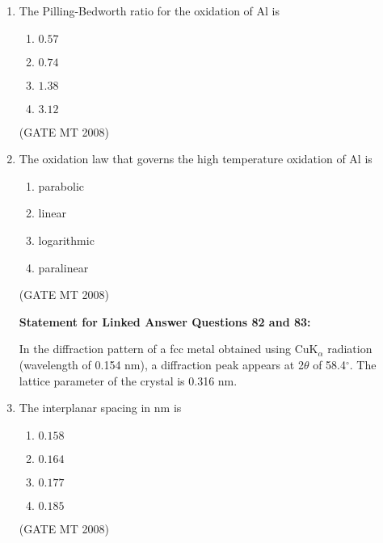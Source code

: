 \documentclass[11pt, letterpaper]{article}
\theoremstyle{remark}
\begin{document}
\begin{enumerate}[label=Q.\arabic*]
    \item The Pilling-Bedworth ratio for the oxidation of Al is
    \begin{multicols}{4}
        \begin{enumerate}[label=(\MakeUppercase{\alph*})]
            \item $0.57$
            \item $0.74$
            \item $1.38$
            \item $3.12$
        \end{enumerate}
    \end{multicols}
\hfill(GATE MT 2008)
    \item The oxidation law that governs the high temperature oxidation of Al is
    \vspace{-0.9em}
    \begin{multicols}{4}
        \begin{enumerate}[label=(\MakeUppercase{\alph*})]
            \item parabolic
            \item linear
            \item logarithmic
            \item paralinear
        \end{enumerate}
    \end{multicols}
\hfill(GATE MT 2008)\\
    \vspace{0.5em}
    
    \textbf{Statement for Linked Answer Questions 82 and 83:}

    In the diffraction pattern of a fcc metal obtained using CuK$_\alpha$ radiation (wavelength of 0.154 nm), 
    a diffraction peak appears at 2$\theta$ of 58.4$^\circ$. The lattice parameter of the crystal is 0.316 nm.

    \item The interplanar spacing in nm is
    \vspace{-0.9em}
    \begin{multicols}{4}
        \begin{enumerate}[label=(\MakeUppercase{\alph*})]
            \item $0.158$
            \item $0.164$
            \item $0.177$
            \item $0.185$
        \end{enumerate}
    \end{multicols}
    \vspace{-5mm}
\hfill(GATE MT 2008)


\end{enumerate}
\end{document}
